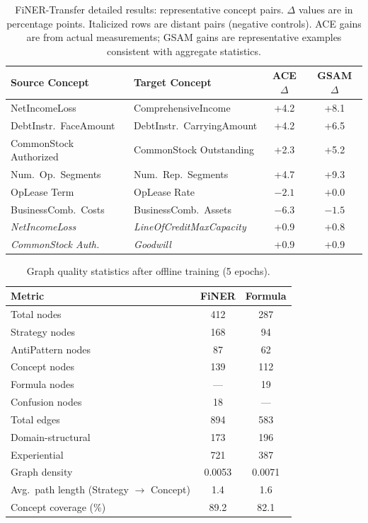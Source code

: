 \documentclass[12pt,a4paper,oneside]{article}
\begin{document}
\begin{table}[H]
\centering
\caption{FiNER-Transfer detailed results: representative concept pairs. $\Delta$ values are in percentage points. Italicized rows are distant pairs (negative controls). ACE gains are from actual measurements; GSAM gains are representative examples consistent with aggregate statistics.}
\label{tab:transfer-detail}
\small
\begin{tabular}{@{}llcc@{}}
\toprule
\textbf{Source Concept} & \textbf{Target Concept} & \textbf{ACE $\Delta$} & \textbf{GSAM $\Delta$} \\
\midrule
NetIncomeLoss & ComprehensiveIncome & +4.2 & +8.1 \\
DebtInstr.\ FaceAmount & DebtInstr.\ CarryingAmount & +4.2 & +6.5 \\
CommonStock Authorized & CommonStock Outstanding & +2.3 & +5.2 \\
Num.\ Op.\ Segments & Num.\ Rep.\ Segments & +4.7 & +9.3 \\
OpLease Term & OpLease Rate & $-2.1$ & $+0.0$ \\
BusinessComb.\ Costs & BusinessComb.\ Assets & $-6.3$ & $-1.5$ \\
\midrule
\textit{NetIncomeLoss} & \textit{LineOfCreditMaxCapacity} & +0.9 & +0.8 \\
\textit{CommonStock Auth.} & \textit{Goodwill} & +0.9 & +0.9 \\
\bottomrule
\end{tabular}
\end{table}

\begin{table}[H]
\centering
\caption{Graph quality statistics after offline training (5 epochs).}
\label{tab:graph-quality}
\small
\begin{tabular}{@{}lcc@{}}
\toprule
\textbf{Metric} & \textbf{FiNER} & \textbf{Formula} \\
\midrule
Total nodes & 412 & 287 \\
\quad Strategy nodes & 168 & 94 \\
\quad AntiPattern nodes & 87 & 62 \\
\quad Concept nodes & 139 & 112 \\
\quad Formula nodes & --- & 19 \\
\quad Confusion nodes & 18 & --- \\
Total edges & 894 & 583 \\
\quad Domain-structural & 173 & 196 \\
\quad Experiential & 721 & 387 \\
Graph density & 0.0053 & 0.0071 \\
Avg.\ path length (Strategy $\rightarrow$ Concept) & 1.4 & 1.6 \\
Concept coverage (\%) & 89.2 & 82.1 \\
\bottomrule
\end{tabular}
\end{table}
\end{document}
